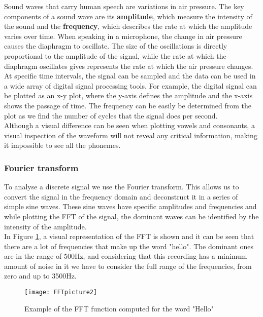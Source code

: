 Sound waves that carry human speech are variations in air pressure. The key components of a sound wave are its \textbf{amplitude}, which measure the intensity of the sound and the \textbf{frequency}, which describes the rate at which the amplitude varies over time. When speaking in a microphone, the change in air pressure causes the diaphragm to oscillate. The size of the oscillations is directly proportional to the amplitude of the signal, while the rate at which the diaphragm oscillates gives represents the rate at which the air pressure changes. At specific time intervals, the signal can be sampled and the data can be used in a wide array of digital signal processing tools. For example, the digital signal can be plotted as an x-y plot, where the y-axis defines the amplitude and the x-axis shows the passage of time. The frequency can be easily be determined from the plot as we find the number of cycles that the signal does per second.\\

Although a visual difference can be seen when plotting vowels and consonants, a visual inspection of the waveform will not reveal any critical information, making it impossible to see all the phonemes.\\

\subsubsection{ Fourier transform}

To analyse a discrete signal we use the Fourier transform. This allows us to convert the signal in the frequency domain and deconstruct it in a series of simple sine waves. These sine waves have specific amplitudes and frequencies and while plotting the FFT of the signal, the dominant waves can be identified by the intensity of the amplitude.\\

In Figure \ref{fig:FFT}, a visual representation of the FFT is shown and it can be seen that there are a lot of frequencies that make up the word "hello". The dominant ones are in the range of 500Hz, and considering that this recording has a minimum amount of noise in it we have to consider the full range of the frequencies, from zero and up to 3500Hz.

\begin{figure}
\texttt{[image: FFTpicture2]}
\centering
\caption{Example of the FFT function computed for the word "Hello"}
\label{fig:FFT}
\end{figure}
